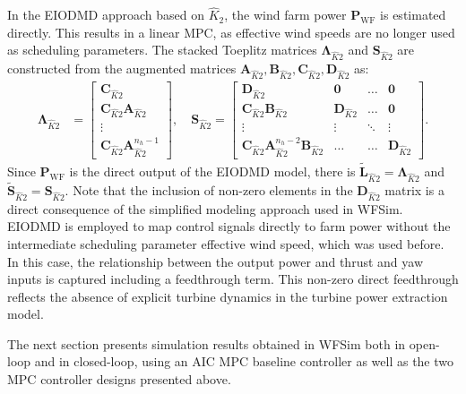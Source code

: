 In the EIODMD approach based on $\hat{K}_2$, the wind farm power $\bm{P}_{\text{WF}}$ is estimated directly. This results in a linear MPC, as effective wind speeds are no longer used as scheduling parameters. The stacked Toeplitz matrices $\bm{\Lambda}_{\hat{K}2}$ and $\bm{S}_{\hat{K}2}$ are constructed from the augmented matrices $\bm{A}_{\hat{K}2}, \bm{B}_{\hat{K}2}, \bm{C}_{\hat{K}2}, \bm{D}_{\hat{K}2}$ as:
\begin{align*}
    \bm{\Lambda}_{\hat{K}2} &= \begin{bmatrix}
        \bm{C}_{\hat{K}2} \\
        \bm{C}_{\hat{K}2} \bm{A}_{\hat{K}2} \\
        \vdots \\
        \bm{C}_{\hat{K}2} \bm{A}_{\hat{K}2}^{n_h-1}
    \end{bmatrix}, \quad
    \bm{S}_{\hat{K}2} =
    \begin{bmatrix}
        \bm{D}_{\hat{K}2} & \bm{0} & \dots & \bm{0}\\
        \bm{C}_{\hat{K}2} \bm{B}_{\hat{K}2} & \bm{D}_{\hat{K}2} & \dots & \bm{0}\\
        \vdots & \vdots & \ddots & \vdots \\
        \bm{C}_{\hat{K}2} \bm{A}_{\hat{K}2}^{n_h-2} \bm{B}_{\hat{K}2} & \dots & \dots & \bm{D}_{\hat{K}2}
    \end{bmatrix}.
\end{align*}
Since $\bm{P}_{\text{WF}}$ is the direct output of the EIODMD model, there is $\tilde{\bm{L}}_{\hat{K}2} = \bm{\Lambda}_{\hat{K}2}$ and $\tilde{\bm{S}}_{\hat{K}2} = \bm{S}_{\hat{K}2}$. Note that the inclusion of non-zero elements in the $\bm{D}_{\hat{K}2}$ matrix is a direct consequence of the simplified modeling approach used in WFSim. EIODMD is employed to map control signals directly to farm power without the intermediate scheduling parameter effective wind speed, which was used before. In this case, the relationship between the output power and thrust and yaw inputs is captured including a feedthrough term. This non-zero direct feedthrough reflects the absence of explicit turbine dynamics in the turbine power extraction model.

The next section presents simulation results obtained in WFSim both in open-loop and in closed-loop, using an AIC MPC baseline controller as well as the two MPC controller designs presented above.


